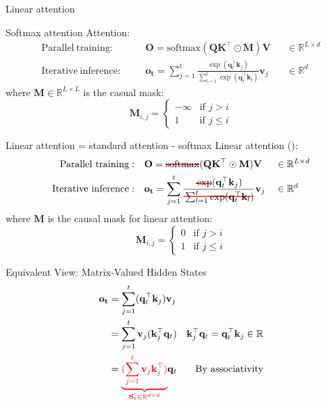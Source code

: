 
\begin{frame}{}
    \centering
    \LARGE
     Linear attention  
\end{frame} 


\begin{frame}{Softmax attention}
     Attention:
    \[
    \begin{aligned}
        \mathrm{Parallel\ training:} &&& \mathbf{O} = \mathrm{softmax}(\mathbf{Q}\mathbf{K}^\top \odot \mathbf{M})\mathbf{V} &&\in \mathbb{R}^{L\times d}   \\
        \mathrm{Iterative\ inference:} &&&\mathbf{o_t} = \sum_{j=1}^t \frac{\exp(\mathbf{q}_t^\top \mathbf{k}_j)}{\sum_{l=1}^t\exp(\mathbf{q}^\top_t \mathbf{k}_l)}\mathbf{v}_j &&\in \mathbb{R}^d 
    \end{aligned}
    \]
    where $\mathbf{M} \in \mathbb{R}^{L \times L}$ is the casual mask:
    \[
    \mathbf{M}_{i,j} = \begin{cases}
        -\infty & \text{if } j > i \\
        1 & \text{if } j \leq i
    \end{cases}
    \]
\end{frame}

\begin{frame}{Linear attention = standard attention - softmax}
    Linear attention (\cite{katharopoulos2020transformers}):
    \[
    \begin{aligned}
        \mathrm{Parallel\ training:} &&& \mathbf{O} = \hcancel[red]{\mathrm{softmax}}(\mathbf{Q}\mathbf{K}^\top \odot \mathbf{M})\mathbf{V} &&\in \mathbb{R}^{L\times d}   \\
        \mathrm{Iterative\ inference:} &&&\mathbf{o_t} = \sum_{j=1}^t \frac{\hcancel[red]{\exp}(\mathbf{q}_t^\top \mathbf{k}_j)}{\hcancel[red]{\sum_{l=1}^t\exp(\mathbf{q}^\top_t \mathbf{k}_l)}}\mathbf{v}_j &&\in \mathbb{R}^d 
    \end{aligned}
    \]
    where $\mathbf{M}$ is the causal mask for linear attention:
    \[
    \mathbf{M}_{i,j} = \begin{cases}
        0 & \text{if } j > i \\
        1 & \text{if } j \leq i
    \end{cases}
    \] 
\end{frame}

\begin{frame}{Equivalent View: Matrix-Valued Hidden States}
    $$ \begin{aligned}  
        \mathbf{o_t} &=  \sum_{j=1}^t (\mathbf{q}_t^\top \mathbf{k}_j) \mathbf{v}_j \\
         &= \sum_{j=1}^t \mathbf{v}_j(\mathbf{k}_j^\top \mathbf{q}_t) &  \mathbf{k}_j^\top \mathbf{q}_t = \mathbf{q}_t^\top \mathbf{k}_j \in \mathbb{R}\\  
        &= {\color{red}\underbrace{(\sum_{j=1}^t \mathbf{v}_j\mathbf{k}_j^\top)}_{\mathbf{S}_t \in \mathbb{R}^{d \times d}}}\mathbf{q}_t & \text{By associativity}
    \end{aligned} $$    
\end{frame}

